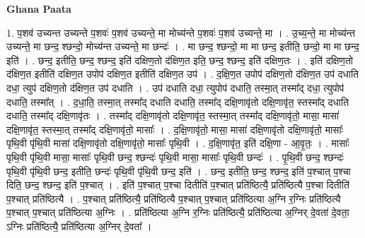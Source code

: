 \documentclass[17pt]{extarticle}
\begin{document}
\textbf{Ghana Paata } \newline

1. प॒शव॑ उच्यन्त उच्यन्ते प॒शवः॑ प॒शव॑ उच्यन्ते॒ मा मोच्य॑न्ते प॒शवः॑ प॒शव॑ उच्यन्ते॒ मा । . उ॒च्य॒न्ते॒ मा मोच्य॑न्त उच्यन्ते॒ मा छन्द॒ श्छन्दो॒ मोच्य॑न्त उच्यन्ते॒ मा छन्दः॑ । . मा छन्द॒ श्छन्दो॒ मा मा छन्द॒ इतीति॒ छन्दो॒ मा मा छन्द॒ इति॑ । . छन्द॒ इतीति॒ छन्द॒ श्छन्द॒ इति॑ दक्षिण॒तो द॑क्षिण॒त इति॒ छन्द॒ श्छन्द॒ इति॑ दक्षिण॒तः । . इति॑ दक्षिण॒तो द॑क्षिण॒त इतीति॑ दक्षिण॒त उपोप॑ दक्षिण॒त इतीति॑ दक्षिण॒त उप॑ । . द॒क्षि॒ण॒त उपोप॑ दक्षिण॒तो द॑क्षिण॒त उप॑ दधाति दधा॒ त्युप॑ दक्षिण॒तो द॑क्षिण॒त उप॑ दधाति । . उप॑ दधाति दधा॒ त्युपोप॑ दधाति॒ तस्मा॒त् तस्मा᳚द् दधा॒ त्युपोप॑ दधाति॒ तस्मा᳚त् । . द॒धा॒ति॒ तस्मा॒त् तस्मा᳚द् दधाति दधाति॒ तस्मा᳚द् दक्षि॒णावृ॑तो दक्षि॒णावृ॑त॒ स्तस्मा᳚द् दधाति दधाति॒ तस्मा᳚द् दक्षि॒णावृ॑तः । . तस्मा᳚द् दक्षि॒णावृ॑तो दक्षि॒णावृ॑त॒ स्तस्मा॒त् तस्मा᳚द् दक्षि॒णावृ॑तो॒ मासा॒ मासा॑ दक्षि॒णावृ॑त॒ स्तस्मा॒त् तस्मा᳚द् दक्षि॒णावृ॑तो॒ मासाः᳚ । . द॒क्षि॒णावृ॑तो॒ मासा॒ मासा॑ दक्षि॒णावृ॑तो दक्षि॒णावृ॑तो॒ मासाः᳚ पृथि॒वी पृ॑थि॒वी मासा॑ दक्षि॒णावृ॑तो दक्षि॒णावृ॑तो॒ मासाः᳚ पृथि॒वी । . द॒क्षि॒णावृ॑त॒ इति॑ दक्षि॒णा - आ॒वृ॒तः॒ । . मासाः᳚ पृथि॒वी पृ॑थि॒वी मासा॒ मासाः᳚ पृथि॒वी छन्द॒ श्छन्दः॑ पृथि॒वी मासा॒ मासाः᳚ पृथि॒वी छन्दः॑ । . पृ॒थि॒वी छन्द॒ श्छन्दः॑ पृथि॒वी पृ॑थि॒वी छन्द॒ इतीति॒ छन्दः॑ पृथि॒वी पृ॑थि॒वी छन्द॒ इति॑ । . छन्द॒ इतीति॒ छन्द॒ श्छन्द॒ इति॑ प॒श्चात् प॒श्चा दिति॒ छन्द॒ श्छन्द॒ इति॑ प॒श्चात् । . इति॑ प॒श्चात् प॒श्चा दितीति॑ प॒श्चात् प्रति॑ष्ठित्यै॒ प्रति॑ष्ठित्यै प॒श्चा दितीति॑ प॒श्चात् प्रति॑ष्ठित्यै । . प॒श्चात् प्रति॑ष्ठित्यै॒ प्रति॑ष्ठित्यै प॒श्चात् प॒श्चात् प्रति॑ष्ठित्या अ॒ग्नि र॒ग्निः प्रति॑ष्ठित्यै प॒श्चात् प॒श्चात् प्रति॑ष्ठित्या अ॒ग्निः । . प्रति॑ष्ठित्या अ॒ग्नि र॒ग्निः प्रति॑ष्ठित्यै॒ प्रति॑ष्ठित्या अ॒ग्निर् दे॒वता॑ दे॒वता॒ ऽग्निः प्रति॑ष्ठित्यै॒ प्रति॑ष्ठित्या अ॒ग्निर् दे॒वता᳚ । \newline
\end{document}
